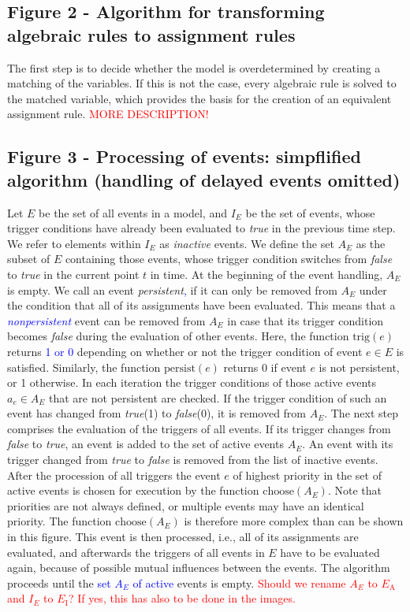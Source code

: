 \documentclass[10pt]{bmc_article}
\newenvironment{bmcformat}{\fussy\setboolean{publ}{true}}{\fussy}
\newcommand{\TODO}[1]{\textcolor{red}{#1}}
\newcommand{\COR}[1]{\textcolor{blue}{#1}}
\newcommand{\true}{\emph{true}\xspace}
\newcommand{\false}{\emph{false}\xspace}
\begin{document}
\begin{bmcformat}
\subsection*{Figure 2 - Algorithm for transforming algebraic rules to assignment rules}
The first step is to decide whether the model is overdetermined by creating a matching of the variables.
If this is not the case, every algebraic rule is solved to the matched variable,
which provides the basis for the creation of an equivalent assignment rule. \TODO{MORE DESCRIPTION!}

\subsection*{Figure 3 - Processing of events: simpflified algorithm (handling of delayed events omitted)}
Let $E$ be the set of all events in a model, and $I_E$ be the set of events, whose trigger
conditions have already been evaluated to \true in the previous time step. We refer to elements within
$I_E$ as \emph{inactive} events. We define the set $A_E$ as the subset of $E$ containing those events,
whose trigger condition switches from \false to \true in the current point $t$ in time. At the beginning
of the event handling, $A_E$ is empty. We call an event \emph{persistent}\COR{,} if it can only be removed from
$A_E$ under the condition that all of its assignments have been evaluated. This means that a
\COR{\emph{nonpersistent}} event can be removed from $A_E$ in case that its trigger condition becomes \false
during the evaluation of other events. Here, the function $\mathrm{trig}(e)$ returns \COR{1 or 0} depending 
on whether or not the trigger condition of event $e \in E$ is satisfied. Similarly, the function
$\mathrm{persist}(e)$ returns 0 if event $e$ is not persistent, or 1 otherwise.
In each iteration the trigger conditions of those active events $a_e \in A_E$ that are not persistent are checked.
If the trigger condition of such an event has changed from \true (1) to \false (0), it is removed from $A_E$.
The next step comprises the evaluation of the triggers of all events.
If its trigger changes from \false to \true, an event is added to the set of active events $A_E$.
An event with its trigger changed from \true to \false is removed from the list of inactive events.
After the procession of all triggers the event $e$ of highest priority in the set of active events is chosen for execution by the function $\mathrm{choose}(A_E)$.
Note that priorities are not always defined, or multiple events may have an identical priority. The function $\mathrm{choose}(A_E)$ is therefore more complex than can be shown in this figure.
This event is then processed, i.e., all of its assignments are evaluated, and afterwards the triggers of all events in $E$ have to be evaluated again, because of possible mutual influences between the events.
The algorithm proceeds until the \COR{set $A_E$ of active} events is empty.
\TODO{Should we rename $A_E$ to $E_\mathrm{A}$ and $I_E$ to $E_\mathrm{I}$? If yes, this has also to be done in the images.}


\end{bmcformat}
\end{document}
